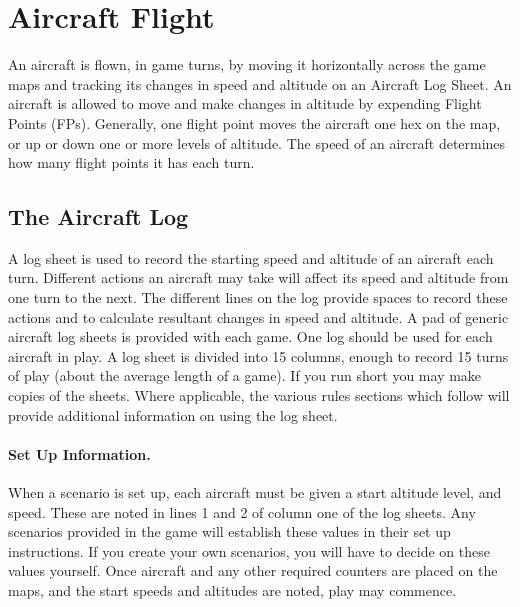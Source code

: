 \section{Aircraft Flight}



An aircraft is flown, in game turns, by moving it horizontally across the game maps and tracking its changes in speed and altitude on an Aircraft Log Sheet. An aircraft is allowed to move and make changes in altitude by expending Flight Points (FPs). Generally, one flight point moves the aircraft one hex on the map, or up or down one or more levels of altitude. The speed of an aircraft determines how many flight points it has each turn.

\subsection{The Aircraft Log}

A log sheet is used to record the starting speed and altitude of an aircraft each turn. Different actions an aircraft may take will affect its speed and altitude from one turn to the next. The different lines on the log provide spaces to record these actions and to calculate resultant changes in speed and altitude. A pad of generic aircraft log sheets is provided with each game. One log should be used for each aircraft in play. A log sheet is divided into 15 columns, enough to record 15 turns of play (about the average length of a game). If you run short you may make copies of the sheets. Where applicable, the various rules sections which follow will provide additional information on using the log sheet.

\paragraph{Set Up Information.} When a scenario is set up, each aircraft must be given a start altitude level, and speed. These are noted in lines 1 and 2 of column one of the log sheets. Any scenarios provided in the game will establish these values in their set up instructions. If you create your own scenarios, you will have to decide on these values yourself. Once aircraft and any other required counters are placed on the maps, and the start speeds and altitudes are noted, play may commence.

